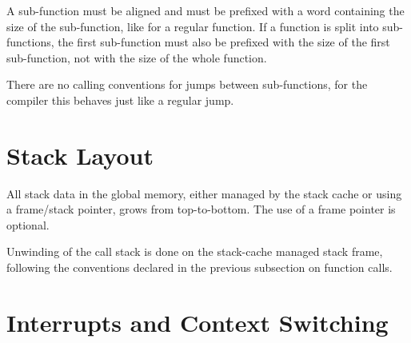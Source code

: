 A sub-function must be aligned and must be prefixed with a word containing the size of the sub-function,
like for a regular function. If a function is split into sub-functions, the first sub-function
must also be prefixed with the size of the first sub-function, not with the size of the whole function.

There are no calling conventions for jumps between sub-functions, for the compiler
this behaves just like a regular jump.






\section{Stack Layout}

All stack data in the global memory, either managed by the stack cache or using
a frame/stack pointer, grows from top-to-bottom. The use of a frame pointer is
optional.

Unwinding of the call stack is done on the stack-cache managed stack frame,
following the conventions declared in the previous subsection on function calls.

\section{Interrupts and Context Switching}


